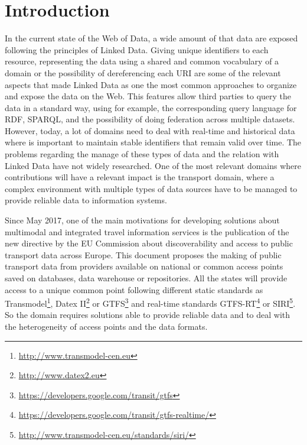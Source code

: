 \documentclass[sw]{iosart2x}
\begin{document}


\section{Introduction}\label{introduction} %
In the current state of the Web of Data, a wide amount of that data are exposed following the principles of Linked Data\cite{bizer2009linked}. Giving unique identifiers to each resource, representing the data using a shared and common vocabulary of a domain or the possibility of dereferencing each URI are some of the relevant aspects that made Linked Data as one the most common approaches to organize and expose the data on the Web\cite{heath2011linked}. This features allow third parties to query the data in a standard way, using for example, the corresponding query language for RDF, SPARQL\cite{prud2006sparql}, and the possibility of doing federation across multiple datasets\cite{buil2013federating}. However, today, a lot of domains need to deal with real-time and historical data where is important to maintain stable identifiers that remain valid over time. The problems regarding the manage of these types of data and the relation with Linked Data have not widely researched. One of the most relevant domains where contributions will have a relevant impact is the transport domain, where a complex environment with multiple types of data sources have to be managed to provide reliable data to information systems.

Since May 2017, one of the main motivations for developing solutions about multimodal and integrated travel information services is the publication of the new directive by the EU Commission about discoverability and access to public transport data across Europe. This document proposes the making of public transport data from providers available on national or common access points saved on databases, data warehouse or repositories. All the states will provide access to a unique common point following different static standards as Transmodel\footnote{\url{http://www.transmodel-cen.eu}}, Datex II\footnote{\url{http://www.datex2.eu}} or GTFS\footnote{\url{https://developers.google.com/transit/gtfs}} and real-time standards GTFS-RT\footnote{\url{https://developers.google.com/transit/gtfs-realtime/}} or SIRI\footnote{\url{http://www.transmodel-cen.eu/standards/siri/}}. So the domain requires solutions able to provide reliable data and to deal with the heterogeneity of access points and the data formats.
\end{document}
